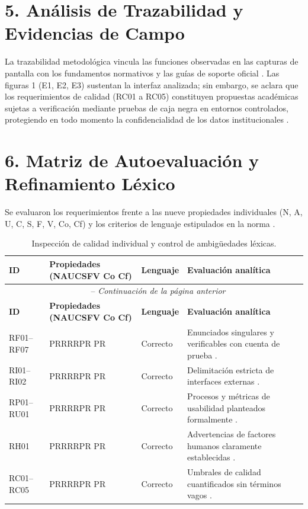 \documentclass[11pt,a4paper]{article}
\begin{document}
	\section*{\textbf{5. Análisis de Trazabilidad y Evidencias de Campo}}
	La trazabilidad metodológica vincula las funciones observadas en las capturas de pantalla con los fundamentos normativos y las guías de soporte oficial \cite{iso29148_2018, sommerville2016}. Las figuras 1 (E1, E2, E3) sustentan la interfaz analizada; sin embargo, se aclara que los requerimientos de calidad (RC01 a RC05) constituyen propuestas académicas sujetas a verificación mediante pruebas de caja negra en entornos controlados, protegiendo en todo momento la confidencialidad de los datos institucionales \cite{lehtola2005}.
	
	\section*{\textbf{6. Matriz de Autoevaluación y Refinamiento Léxico}}
	Se evaluaron los requerimientos frente a las nueve propiedades individuales (N, A, U, C, S, F, V, Co, Cf) y los criterios de lenguaje estipulados en la norma \cite{iso29148_2018}.
	
	\begin{longtable}{p{1.2cm} p{3.2cm} p{1.6cm} p{7.0cm}}
		\caption{Inspección de calidad individual y control de ambigüedades léxicas.} \\
		\toprule
		\textbf{ID} & \textbf{Propiedades (NAUCSFV Co Cf)} & \textbf{Lenguaje} & \textbf{Evaluación analítica} \\
		\midrule
		\endfirsthead
		\multicolumn{4}{c}{\tablename\ \thetable\ -- \textit{Continuación de la página anterior}} \\
		\toprule
		\textbf{ID} & \textbf{Propiedades (NAUCSFV Co Cf)} & \textbf{Lenguaje} & \textbf{Evaluación analítica} \\
		\midrule
		\endhead
		\bottomrule
		\endfoot
		RF01--RF07 & PRRRRPR PR & Correcto & Enunciados singulares y verificables con cuenta de prueba \cite{iso29148_2018}. \\
		RI01--RI02 & PRRRRPR PR & Correcto & Delimitación estricta de interfaces externas \cite{iso29148_2018}. \\
		RP01--RU01 & PRRRRPR PR & Correcto & Procesos y métricas de usabilidad planteados formalmente \cite{iso29148_2018}. \\
		RH01 & PRRRRPR PR & Correcto & Advertencias de factores humanos claramente establecidas \cite{iso29148_2018}. \\
		RC01--RC05 & PRRRRPR PR & Correcto & Umbrales de calidad cuantificados sin términos vagos \cite{iso25010_2023}. \\
		\bottomrule
	\end{longtable}
	
\end{document}
